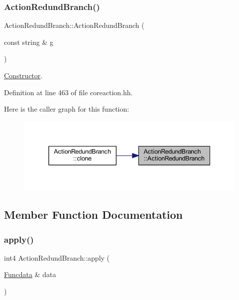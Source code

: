 \subsubsection{\texorpdfstring{ActionRedundBranch()}{ActionRedundBranch()}}
{\footnotesize\ttfamily Action\+Redund\+Branch\+::\+Action\+Redund\+Branch (\begin{DoxyParamCaption}\item[{const string \&}]{g }\end{DoxyParamCaption})\hspace{0.3cm}{\ttfamily [inline]}}



\mbox{\hyperlink{class_constructor}{Constructor}}. 



Definition at line 463 of file coreaction.\+hh.

Here is the caller graph for this function\+:
\nopagebreak
\begin{figure}[H]
\begin{center}
\leavevmode
\includegraphics[width=338pt]{class_action_redund_branch_a024c34d46e588fd2aeb8cc12599f6c77_icgraph}
\end{center}
\end{figure}


\subsection{Member Function Documentation}
\mbox{\label{class_action_redund_branch_ac7caec1379a7cb37fba45fe2bd75199f}} 
\subsubsection{\texorpdfstring{apply()}{apply()}}
{\footnotesize\ttfamily int4 Action\+Redund\+Branch\+::apply (\begin{DoxyParamCaption}\item[{\mbox{\hyperlink{class_funcdata}{Funcdata}} \&}]{data }\end{DoxyParamCaption})\hspace{0.3cm}{\ttfamily [virtual]}}



